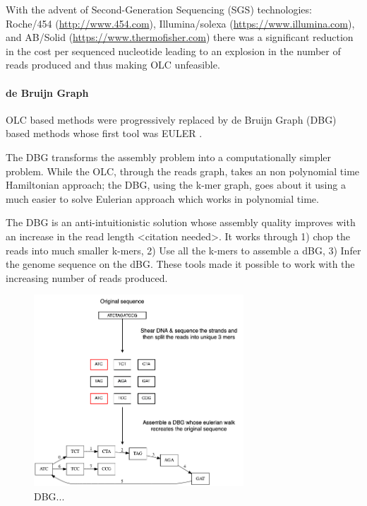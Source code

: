 \documentclass[10pt, a4paper]{article}
\begin{document}
With the advent of Second-Generation Sequencing (SGS) technologies:
Roche/454 (\url{http://www.454.com}), Illumina/solexa (\url{https://www.illumina.com}),
and AB/Solid (\url{https://www.thermofisher.com}) there was a significant reduction in
the cost per sequenced nucleotide \cite{liComparisonTwoMajor2012} leading to an
explosion in the number of reads produced and thus making OLC unfeasible.

\paragraph{de Bruijn Graph}
\label{sec:org20a1577}
OLC based methods were progressively replaced by de Bruijn Graph (DBG)
\cite{iduryNewAlgorithmDNA1995} based methods whose first tool was EULER
\cite{pevznerEulerianPathApproach2001}.

The DBG transforms the assembly problem into a computationally simpler problem.
While the OLC, through the reads graph, takes an non polynomial time Hamiltonian
approach; the DBG, using the k-mer graph, goes about it using a much easier to
solve Eulerian approach which works in polynomial time.
\cite{liComparisonTwoMajor2012,pevznerEulerianPathApproach2001}

The DBG is an anti-intuitionistic solution whose assembly quality improves with
an increase in the read length <citation needed>. It works through 1) chop the reads into
much smaller k-mers, 2) Use all the k-mers to assemble a dBG, 3) Infer the
genome sequence on the dBG. These tools made it possible to work with the
increasing number of reads produced.

\begin{figure}[H]
\centering
\includegraphics[width=0.7\textwidth]{figures/de Bruijn Graph.png}
\caption{DBG...}
\end{figure}
\end{document}
